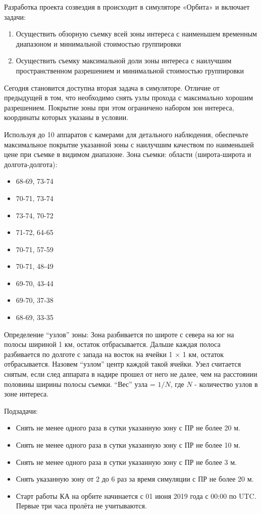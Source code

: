 Разработка проекта созвездия в происходит в симуляторе «Орбита» и включает задачи:

\begin{enumerate}
    \item Осуществить обзорную съемку всей зоны интереса с наименьшем временным диапазоном и минимальной стоимостью группировки
    \item Осуществить съемку максимальной доли зоны интереса с наилучшим пространственном разрешением и минимальной стоимостью группировки
\end{enumerate}

Сегодня становится доступна вторая задача в симуляторе. Отличие от предыдущей в том, что необходимо снять узлы прохода с максимально хорошим разрешением. Покрытие зоны при этом ограничено набором зон интереса, координаты которых указаны в условии.


Используя до 10 аппаратов с камерами для детального наблюдения, обеспечьте максимальное покрытие указанной зоны с наилучшим качеством по наименьшей цене при съемке в видимом диапазоне.
Зона съемки: области (широта-широта и долгота-долгота):

\begin{itemize}
    \item 68-69, 73-74
    \item 70-71, 73-74
    \item 73-74, 70-72
    \item 71-72, 64-65
    \item 70-71, 57-59
    \item 70-71, 48-49
    \item 69-70, 43-44
    \item 69-70, 37-38
    \item 68-69, 33-35
\end{itemize}

Определение “узлов” зоны: Зона разбивается по широте с севера на юг на полосы шириной 1 км, остаток отбрасывается. Дальше каждая полоса разбивается по долготе с запада на восток на ячейки 1 $\times$ 1 км, остаток отбрасывается. Назовем “узлом” центр каждой такой ячейки. Узел считается снятым, если след аппарата в надире прошел от него не далее, чем на расстоянии половины ширины полосы съемки. “Вес” узла = $1/N$, где $N$ - количество узлов в зоне интереса.

Подзадачи:

\begin{itemize}
    \item Снять не менее одного раза в сутки указанную зону с ПР не более 20 м.
    \item Снять не менее одного раза в сутки указанную зону с ПР не более 10 м.
    \item Снять не менее одного раза в сутки указанную зону с ПР не более 3 м.
    \item Снять указанную зону от 2 до 6 раз за время симуляции с ПР не более 20 м.
    \item Старт работы КА на орбите начинается с 01 июня 2019 года с 00:00 по UTC. Первые три часа пролёта не учитываются.
\end{itemize}

